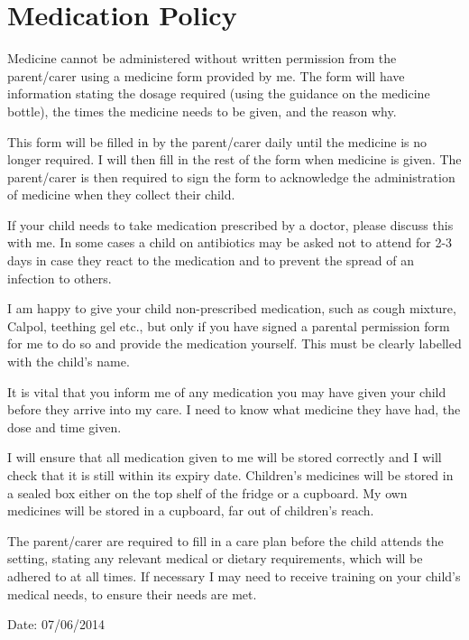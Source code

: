 \documentclass[10pt]{article}
\begin{document}
\section{Medication Policy}

Medicine cannot be administered without written permission from the
parent/carer using a medicine form provided by me. The form will have
information stating the dosage required (using the guidance on the
medicine bottle), the times the medicine needs to be given, and the
reason why.

This form will be filled in by the parent/carer daily until the medicine
is no longer required. I will then fill in the rest of the form when
medicine is given. The parent/carer is then required to sign the form to
acknowledge the administration of medicine when they collect their
child.

If your child needs to take medication prescribed by a doctor, please
discuss this with me. In some cases a child on antibiotics may be asked
not to attend for 2-3 days in case they react to the medication and to
prevent the spread of an infection to others.

I am happy to give your child non-prescribed medication, such as cough
mixture, Calpol, teething gel etc., but only if you have signed a
parental permission form for me to do so and provide the medication
yourself. This must be clearly labelled with the child's name.

It is vital that you inform me of any medication you may have given your
child before they arrive into my care. I need to know what medicine they
have had, the dose and time given.

I will ensure that all medication given to me will be stored correctly
and I will check that it is still within its expiry date. Children's
medicines will be stored in a sealed box either on the top shelf of the
fridge or a cupboard. My own medicines will be stored in a cupboard, far
out of children's reach.

The parent/carer are required to fill in a care plan before the child
attends the setting, stating any relevant medical or dietary
requirements, which will be adhered to at all times. If necessary I may
need to receive training on your child's medical needs, to ensure their
needs are met.

Date: 07/06/2014

~
\end{document}
